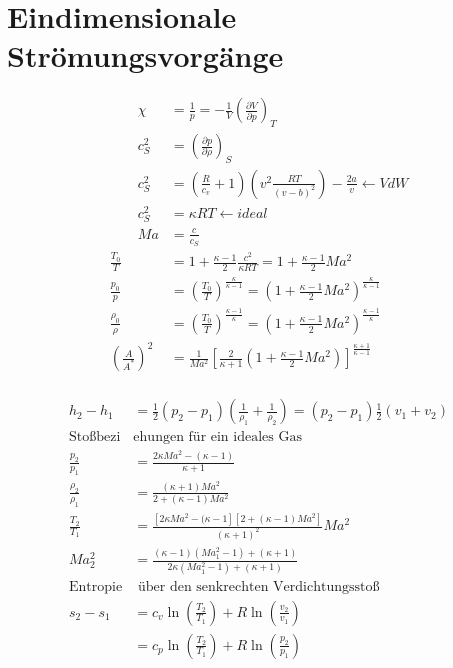 \documentclass[twocolumn]{article}
\begin{document}
\section{Eindimensionale Strömungsvorgänge}
\begin{multicols}{2}

\begin{align*}
	\qquad  \chi &= \frac{1}{p} = - \frac{1}{V}\left(\frac{\partial V}{\partial p}\right)_{T}  \\
	\qquad c_S^2 &= \left(\frac{\partial p}{\partial \rho}\right)_{S} \\
	\qquad c_S^2 &= \left(\frac{R}{c_v}+ 1\right)\left(v^2 \frac{RT}{(v-b)^2}\right) - \frac{2a}{v}\leftarrow VdW \\
	\qquad c_S^2 &= \kappa RT \leftarrow ideal\\
	\qquad Ma &= \frac{c}{c_S} \\
		\frac{T_0}{T} &= 1 + \frac{\kappa -1}{2} \frac{c^2}{\kappa RT} = 1 + \frac{\kappa -1}{2}Ma^2 \\
		\frac{p_0}{p} &= \left(\frac{T_0}{T}\right)^{\frac{\kappa}{\kappa-1}} = \left(1 + \frac{\kappa -1}{2}Ma^2\right)^{\frac{\kappa}{\kappa-1}} \\
		\frac{\rho_0}{\rho} &= \left(\frac{T_0}{T}\right)^{\frac{\kappa-1}{\kappa}} = \left(1 + \frac{\kappa -1}{2}Ma^2\right)^{\frac{\kappa -1 }{\kappa}} \\
		\left(\frac{A}{A^{*}}\right)^2 &= \frac{1}{Ma^2}\left[\frac{2}{\kappa + 1}\left( 1 + \frac{\kappa -1}{2} Ma^2 \right)\right]^{\frac{\kappa +1}{\kappa -1}} \\
\end{align*}

	\begin{align*}
		h_2 - h_1 &= \frac{1}{2}(p_2 - p_1) \left(\frac{1}{\rho_1} + \frac{1}{\rho_2}\right) = (p_2 -p_1) \frac{1}{2}(v_1 + v_2) \\
		\text{Stoßbezi}&\text{ehungen für ein ideales Gas} \\
		\frac{p_2}{p_1} &= \frac{2 \kappa Ma^2 - (\kappa -1)}{\kappa +1} \\
		\frac{\rho_2}{\rho_1} &= \frac{(\kappa +1 ) Ma^2}{2 + (\kappa -1) Ma^2} \\
		\frac{T_2}{T_1} &= \frac{\left[2\kappa Ma^2 - (\kappa -1 \right]\left[2 + (\kappa -1) Ma^2\right]}{(\kappa +1)^2}Ma^2 \\
		Ma_2^2 &= \frac{(\kappa -1)(Ma_1^2 -1) + (\kappa +1)}{2\kappa (Ma_1^2 -1 ) + (\kappa +1)} \\
		\text{Entropie}&\text{ über den senkrechten Verdichtungsstoß} \\
		s_2 -s_1 &= c_v \ln \left(\frac{T_2}{T_1}\right) + R \ln\left(\frac{v_2}{v_1}\right) \\
			 &= c_p \ln \left(\frac{T_2}{T_1}\right) + R \ln\left(\frac{p_2}{p_1}\right) \\
	\end{align*}
\end{multicols}
\end{document}
